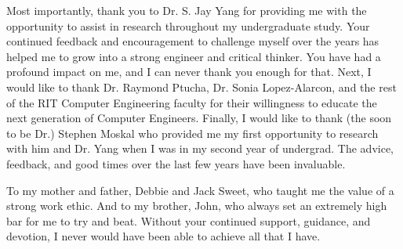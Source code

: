 \frontmatter

\begin{acknowledgments}
	\vfill
	\begin{center}
		\indent Most importantly, thank you to Dr. S. Jay Yang for providing me with the opportunity to assist in research throughout my undergraduate study. Your continued feedback and encouragement to challenge myself over the years has helped me to grow into a strong engineer and critical thinker. You have had a profound impact on me, and I can never thank you enough for that. Next, I would like to thank Dr. Raymond Ptucha, Dr. Sonia Lopez-Alarcon, and the rest of the RIT Computer Engineering faculty for their willingness to educate the next generation of Computer Engineers. Finally, I would like to thank (the soon to be Dr.) Stephen Moskal who provided me my first opportunity to research with him and Dr. Yang when I was in my second year of undergrad. The advice, feedback, and good times over the last few years have been invaluable. 
	\end{center}
	\vfill
\end{acknowledgments}


\begin{dedication}
	\vfill
	\begin{center}
		To my mother and father, Debbie and Jack Sweet, who taught me the value of a strong work ethic. And to my brother, John, who always set an extremely high bar for me to try and beat. Without your continued support, guidance, and devotion, I never would have been able to achieve all that I have. 
	\end{center}
	\vfill
\end{dedication}


